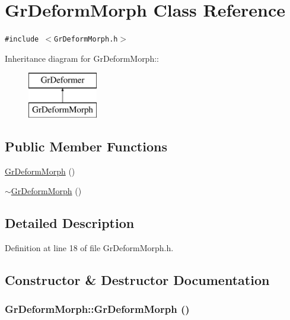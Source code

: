 \hypertarget{class_gr_deform_morph}{
\section{GrDeformMorph Class Reference}
\label{class_gr_deform_morph}
}
{\tt \#include $<$GrDeformMorph.h$>$}

Inheritance diagram for GrDeformMorph::\begin{figure}[H]
\begin{center}
\leavevmode
\includegraphics[height=2cm]{class_gr_deform_morph}
\end{center}
\end{figure}
\subsection*{Public Member Functions}
\begin{CompactItemize}
\item 
\hyperlink{class_gr_deform_morph_0cd3a5d26c9f344e25df8912aed2881e}{GrDeformMorph} ()
\item 
\hyperlink{class_gr_deform_morph_2e94b7446a5ca2cefed5688eff0b0e0f}{$\sim$GrDeformMorph} ()
\end{CompactItemize}


\subsection{Detailed Description}


Definition at line 18 of file GrDeformMorph.h.

\subsection{Constructor \& Destructor Documentation}
\hypertarget{class_gr_deform_morph_0cd3a5d26c9f344e25df8912aed2881e}{
\subsubsection[{GrDeformMorph}]{\setlength{\rightskip}{0pt plus 5cm}GrDeformMorph::GrDeformMorph ()}}
\label{class_gr_deform_morph_0cd3a5d26c9f344e25df8912aed2881e}


